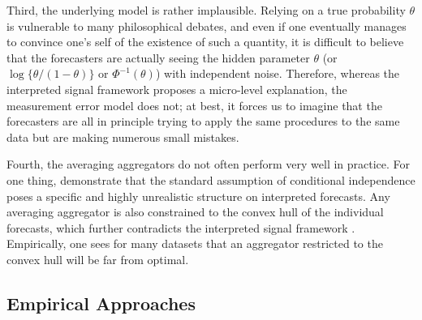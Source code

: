 \documentclass[12pt]{article}
\theoremstyle{definition}
\theoremstyle{definition}
\begin{document}

Third,  the
underlying model is rather implausible. Relying on a true probability $\theta$ is vulnerable to
many philosophical debates, and even if one eventually manages to
convince one's self of the existence of such a quantity, it is
difficult to believe that the forecasters are actually seeing the
hidden parameter $\theta$ (or $\log\{\theta/(1-\theta)\}$ or
$\Phi^{-1}(\theta)$) with independent noise. Therefore, whereas the
interpreted signal framework proposes a micro-level explanation, the
measurement error model does not; at best, it forces us to imagine that
the forecasters are all in principle trying to apply the same
procedures to the same data but are making numerous small mistakes. 

Fourth, the averaging aggregators do not often perform
very well in practice. For one thing,  \citet{hong2009interpreted} demonstrate that the standard
assumption of conditional independence poses a specific and highly
unrealistic structure on interpreted forecasts. Any averaging aggregator is also constrained to
the convex hull of the individual forecasts, which further contradicts the
interpreted signal framework \citep{parunak2013characterizing}.  Empirically, one sees
for many datasets that an aggregator restricted to the convex hull
will be far from optimal.

\subsection{Empirical Approaches}
\label{ss:empirical}
\end{document}
